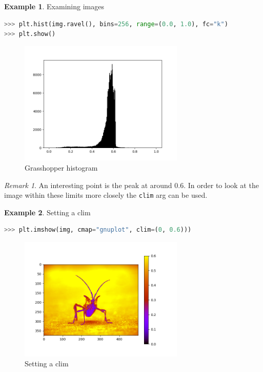 \documentclass{article}
\theoremstyle{definition}
\newtheorem{ex}{Example}[subsection]
\theoremstyle{remark}
\newtheorem*{rem}{Remark}
\begin{document}
\begin{ex}Examining images
\begin{lstlisting}[language=Python]
>>> plt.hist(img.ravel(), bins=256, range=(0.0, 1.0), fc="k")
>>> plt.show()
\end{lstlisting}


\begin{figure}[H]
    \centering
    \includegraphics[width=0.7\textwidth]{matplotlib_exm_img}
    \caption{Grasshopper histogram}
    \label{fig:mpl_exm_img}
\end{figure}

\begin{rem}
    An interesting point is the peak at around 0.6. In order to look at the image within these limits more closely the \lstinline{clim} arg can be used.
\end{rem}
\end{ex}

\begin{ex}Setting a clim
\begin{lstlisting}[language=Python]
>>> plt.imshow(img, cmap="gnuplot", clim=(0, 0.6)))
\end{lstlisting}
\begin{figure}[H]
    \centering
    \includegraphics[width=0.7\textwidth]{matplotlib_ceil_img}
    \caption{Setting a clim}
    \label{fig:mpl_clim}
\end{figure}
\end{ex}
\end{document}
